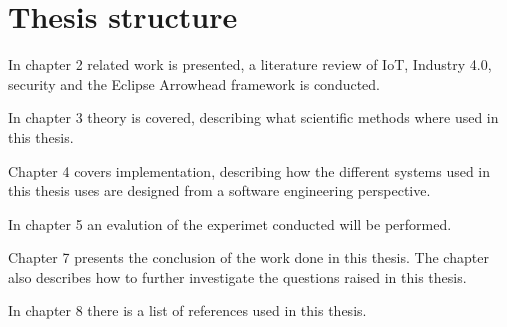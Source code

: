 \section{Thesis structure}
In chapter 2 related work is presented, a literature review of IoT, Industry 4.0, security and the Eclipse Arrowhead framework is conducted. 

In chapter 3 theory is covered, describing what scientific methods where used in this thesis. 

Chapter 4 covers implementation, describing how the different systems used in this thesis uses are designed from a software engineering perspective.

In chapter 5 an evalution of the experimet conducted will be performed. 

Chapter 7 presents the conclusion of the work done in this thesis. The chapter also describes how to further investigate the questions raised in this thesis. 

In chapter 8  there is a list of references used in this thesis.
